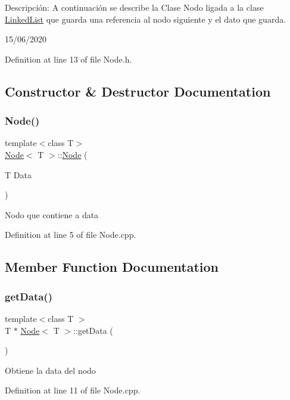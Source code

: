 Descripción\+: A continuación se describe la Clase Nodo ligada a la clase \hyperlink{class_linked_list}{Linked\+List} que guarda una referencia al nodo siguiente y el dato que guarda. 

15/06/2020 

Definition at line 13 of file Node.\+h.



\subsection{Constructor \& Destructor Documentation}
\mbox{\label{class_node_a68c5bd839a73a772a935943075121c5c}} 
\subsubsection{\texorpdfstring{Node()}{Node()}}
{\footnotesize\ttfamily template$<$class T$>$ \\
\hyperlink{class_node}{Node}$<$ T $>$\+::\hyperlink{class_node}{Node} (\begin{DoxyParamCaption}\item[{T}]{Data }\end{DoxyParamCaption})}

Nodo que contiene a data 

Definition at line 5 of file Node.\+cpp.



\subsection{Member Function Documentation}
\mbox{\label{class_node_a130e6bec4c78a3885b7da48e16ec2764}} 
\subsubsection{\texorpdfstring{get\+Data()}{getData()}}
{\footnotesize\ttfamily template$<$class T $>$ \\
T $\ast$ \hyperlink{class_node}{Node}$<$ T $>$\+::get\+Data (\begin{DoxyParamCaption}{ }\end{DoxyParamCaption})}

Obtiene la data del nodo 

Definition at line 11 of file Node.\+cpp.

